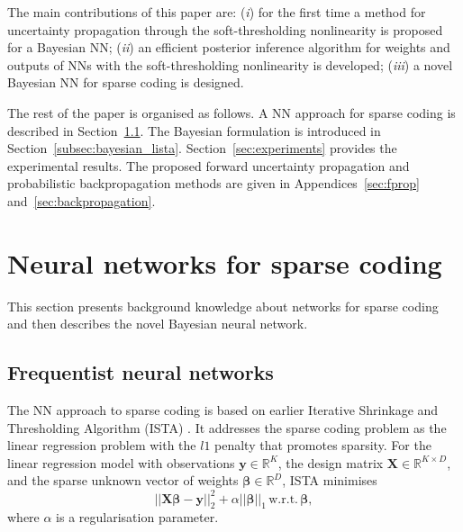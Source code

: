 \documentclass{article}
\begin{document}
  The main contributions of this paper are: (\textit{i}) for the first time a method for uncertainty propagation through the soft-thresholding nonlinearity is proposed for a Bayesian NN; (\textit{ii}) an efficient posterior inference algorithm for weights and outputs of NNs with the soft-thresholding nonlinearity is developed; (\textit{iii}) a novel Bayesian NN for sparse coding is designed.

 The rest of the paper is organised as follows. A NN approach for sparse coding is described in Section~\ref{subsec:nn_sc}. The Bayesian formulation is introduced in Section~\ref{subsec:bayesian_lista}. Section~\ref{sec:experiments} provides the experimental results. The proposed forward uncertainty propagation and probabilistic backpropagation methods are given in Appendices~\ref{sec:fprop} and~\ref{sec:backpropagation}. 
\section{Neural networks for sparse coding}
  \label{sec:bayesian_lista}
  This section presents background knowledge about networks for sparse coding and then describes the novel Bayesian neural network. 
\subsection{Frequentist neural networks}  
\label{subsec:nn_sc}
  The NN approach to sparse coding is based on earlier Iterative Shrinkage and Thresholding Algorithm (ISTA) \cite{daubechies2004iterative}. It addresses the sparse coding problem as the linear regression problem with the $l1$ penalty that promotes sparsity. For the linear regression model with observations $\mathbf{y} \in \mathbb{R}^K$, the design matrix $\mathbf{X} \in \mathbb{R}^{K \times D}$, and the sparse unknown vector of weights $\boldsymbol\beta \in \mathbb{R}^D$, ISTA minimises
  \begin{equation}
  \label{eq:regression_problem}
  ||\mathbf{X}\boldsymbol\beta - \mathbf{y}||_2^2 + \alpha ||\boldsymbol\beta||_1 \, \text{w.r.t.} \, \boldsymbol\beta,
  \end{equation}
where $\alpha$ is a regularisation parameter.
 
\end{document}
